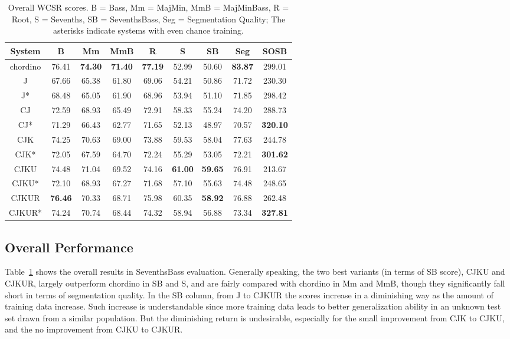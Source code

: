 \begin{table}[htb]
\caption{Overall WCSR scores. B = Bass, Mm = MajMin, MmB = MajMinBass, R = Root, S = Sevenths, SB = SeventhsBass, Seg = Segmentation Quality; The asterisks indicate systems with even chance training.}
\label{tab:4-overallres}
\centering
\footnotesize
\begin{tabular}{|c|c|c|c|c|c|c|c|c|}\hline
System & B & Mm & MmB & R & S & SB & Seg & SOSB \\ \hline
chordino & 76.41 & \textbf{74.30} & \textbf{71.40} & \textbf{77.19} & 52.99 & 50.60 & \textbf{83.87} & 299.01\\ \hline
J& 67.66 & 65.38 & 61.80 & 69.06 & 54.21 & 50.86 & 71.72 & 230.30 \\ \hline
J* & 68.48 & 65.05 & 61.90 & 68.96 & 53.94 & 51.10 & 71.85 & 298.42 \\ \hline
CJ & 72.59 & 68.93 & 65.49 & 72.91 & 58.33 & 55.24 & 74.20 & 288.73 \\ \hline
CJ* & 71.29 & 66.43 & 62.77 & 71.65 & 52.13 & 48.97 & 70.57 & \textbf{320.10} \\ \hline
CJK & 74.25 & 70.63 & 69.00 & 73.88 & 59.53 & 58.04 & 77.63 & 244.78 \\ \hline
CJK* & 72.05 & 67.59 & 64.70 & 72.24 & 55.29 & 53.05 & 72.21& \textbf{301.62} \\ \hline
CJKU & 74.48 & 71.04 & 69.52 & 74.16 & \textbf{61.00} & \textbf{59.65} & 76.91 & 213.67 \\ \hline
CJKU* & 72.10 & 68.93 & 67.27 & 71.68 & 57.10 & 55.63 & 74.48 & 248.65 \\ \hline
CJKUR & \textbf{76.46} & 70.33 & 68.71 & 75.98 & 60.35 & \textbf{58.92} & 76.88 & 262.48 \\ \hline
CJKUR* & 74.24 & 70.74 & 68.44 & 74.32 & 58.94 & 56.88 & 73.34 & \textbf{327.81} \\ \hline
\end{tabular}
\end{table}

\subsection{Overall Performance}
Table~\ref{tab:4-overallres} shows the overall results in SeventhsBass evaluation. Generally speaking, the two best variants (in terms of SB score), CJKU and CJKUR, largely outperform chordino in SB and S, and are fairly compared with chordino in Mm and MmB, though they significantly fall short in terms of segmentation quality. In the SB column, from J to CJKUR the scores increase in a diminishing way as the amount of training data increase. Such increase is understandable since more training data leads to better generalization ability in an unknown test set drawn from a similar population. But the diminishing return is undesirable, especially for the small improvement from CJK to CJKU, and the no improvement from CJKU to CJKUR.

